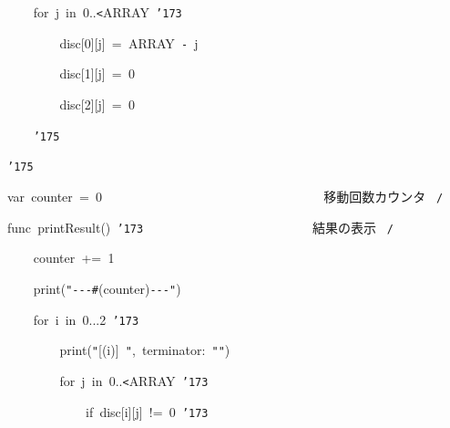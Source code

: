 \documentclass[a4paper,10pt]{article}
\def\mc{\relax}
\begin{document}
\noindent
\mbox{}{\tt\mc \ }{\tt\mc \ }{\tt\mc \ }{\tt\mc \ }for{\tt\mc \ }j{\tt\mc \ }in{\tt\mc \ }0..{\tt <}ARRAY{\tt\mc \ }{\tt\char'173}

\noindent
\mbox{}{\tt\mc \ }{\tt\mc \ }{\tt\mc \ }{\tt\mc \ }{\tt\mc \ }{\tt\mc \ }{\tt\mc \ }{\tt\mc \ }disc[0][j]{\tt\mc \ }={\tt\mc \ }ARRAY{\tt\mc \ }{\tt -}{\tt\mc \ }j

\noindent
\mbox{}{\tt\mc \ }{\tt\mc \ }{\tt\mc \ }{\tt\mc \ }{\tt\mc \ }{\tt\mc \ }{\tt\mc \ }{\tt\mc \ }disc[1][j]{\tt\mc \ }={\tt\mc \ }0

\noindent
\mbox{}{\tt\mc \ }{\tt\mc \ }{\tt\mc \ }{\tt\mc \ }{\tt\mc \ }{\tt\mc \ }{\tt\mc \ }{\tt\mc \ }disc[2][j]{\tt\mc \ }={\tt\mc \ }0

\noindent
\mbox{}{\tt\mc \ }{\tt\mc \ }{\tt\mc \ }{\tt\mc \ }{\tt\char'175}

\noindent
\mbox{}{\tt\char'175}

\noindent
\mbox{}\hfill

\noindent
\mbox{}var{\tt\mc \ }counter{\tt\mc \ }={\tt\mc \ }0{\tt\mc \ \ \ \ \ \ \ \ }{\tt\mc \ \ \ \ \ \ \ \ }{\tt\mc \ \ \ \ \ \ \ \ }{\tt\mc \ \ \ \ \ \ \ \ }\rm\mc {\tt /}{\tt *}\  \ 移動回数カウンタ \hfill \rm\mc \ {\tt *}{\tt /}
\tt\mc 

\noindent
\mbox{}\hfill

\noindent
\mbox{}func{\tt\mc \ }printResult(){\tt\mc \ }{\tt\char'173}{\tt\mc \ \ \ \ \ \ \ \ }{\tt\mc \ \ \ \ \ \ \ \ }{\tt\mc \ \ \ \ \ \ \ \ }\rm\mc {\tt /}{\tt *}\  \ 結果の表示 \hfill \rm\mc \ {\tt *}{\tt /}
\tt\mc 

\noindent
\mbox{}{\tt\mc \ }{\tt\mc \ }{\tt\mc \ }{\tt\mc \ }counter{\tt\mc \ }+={\tt\mc \ }1

\noindent
\mbox{}{\tt\mc \ }{\tt\mc \ }{\tt\mc \ }{\tt\mc \ }print({\tt "}{\tt -}{\tt -}{\tt -}{\tt\#}{\tt{}}(counter){\tt -}{\tt -}{\tt -}{\tt "})

\noindent
\mbox{}{\tt\mc \ }{\tt\mc \ }{\tt\mc \ }{\tt\mc \ }for{\tt\mc \ }i{\tt\mc \ }in{\tt\mc \ }0...2{\tt\mc \ }{\tt\char'173}

\noindent
\mbox{}{\tt\mc \ }{\tt\mc \ }{\tt\mc \ }{\tt\mc \ }{\tt\mc \ }{\tt\mc \ }{\tt\mc \ }{\tt\mc \ }print({\tt "}[{\tt{}}(i)]{\tt\mc \ }{\tt "},{\tt\mc \ }terminator:{\tt\mc \ }{\tt "}{\tt "})

\noindent
\mbox{}{\tt\mc \ }{\tt\mc \ }{\tt\mc \ }{\tt\mc \ }{\tt\mc \ }{\tt\mc \ }{\tt\mc \ }{\tt\mc \ }for{\tt\mc \ }j{\tt\mc \ }in{\tt\mc \ }0..{\tt <}ARRAY{\tt\mc \ }{\tt\char'173}

\noindent
\mbox{}{\tt\mc \ }{\tt\mc \ }{\tt\mc \ }{\tt\mc \ }{\tt\mc \ }{\tt\mc \ }{\tt\mc \ }{\tt\mc \ }{\tt\mc \ }{\tt\mc \ }{\tt\mc \ }{\tt\mc \ }if{\tt\mc \ }disc[i][j]{\tt\mc \ }!={\tt\mc \ }0{\tt\mc \ }{\tt\char'173}
\end{document}
